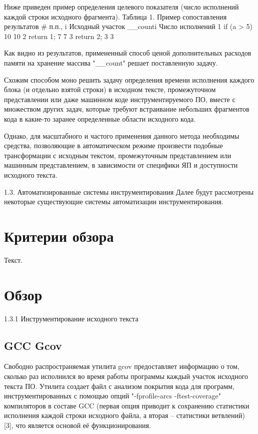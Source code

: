 Ниже приведен пример определения целевого показателя (число исполнений каждой строки исходного фрагмента).
Таблица 1. Пример сопоставления результатов
\# п.п., i  Исходный участок  \_\_counti  Число исполнений
1  if (a > 5)  10  10
2  { return 1; }  7  7
3  { return 2; }  3  3

Как видно из результатов, примененный способ ценой дополнительных расходов памяти на хранение массива "\_\_count" решает поставленную задачу.

Схожим способом моно решить задачу определения времени исполнения каждого блока (и отдельно взятой строки) в исходном тексте, промежуточном представлении или даже машинном коде инструментируемого ПО, вместе с множеством других задач, которые требуют встраивание небольших фрагментов кода в какие-то заранее определенные области исходного кода.

Однако, для масштабного и частого применения данного метода необходимы средства, позволяющие в автоматическом режиме произвести подобные трансформации с исходным текстом, промежуточным представлением или машинным представлением, в зависимости от специфики ЯП и доступности исходного текста.

1.3. Автоматизированные системы инструментирования
Далее будут рассмотрены некоторые существующие системы автоматизации инструментирования.

\section{Критерии обзора}

Текст.

\section{Обзор}

1.3.1 Инструментирование исходного текста

\subsection{GCC Gcov}
Свободно распространяемая утилита gcov предоставляет информацию о том, сколько раз исполнился во время работы программы каждый участок исходного текста ПО. Утилита создает файл с анализом покрытия кода для программ, инструментированных с помощью опций "-fprofile-arcs -ftest-coverage" компиляторов в составе GCC (первая опция приводит к сохранению статистики исполнения каждой строки исходного файла, а вторая -- статистики ветвлений) [3], что является основой её функционирования.

